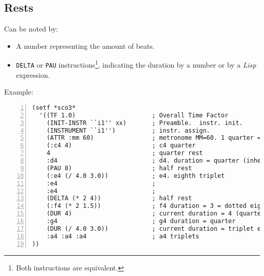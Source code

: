 \subsection{Rests}
Can be noted by:
\begin{itemize}
  \item A number representing the amount of beats.
    \item \texttt{DELTA} or \texttt{PAU} instructions\footnote{Both instructions are equivalent.}, indicating the duration by a number or by a \textit{Lisp} expression.
\end{itemize}
Example:
\begin{Verbatim}[frame=single,fontsize=\small,numbers=left,numbersep=2mm,
                 commandchars=+\[\]]
(setf *sco3*
  '((TF 1.0)                     ; Overall Time Factor
    (INIT-INSTR ``i1'' xx)       ; Preamble.  instr. init.
    (INSTRUMENT ``i1'')          ; instr. assign.
    (ATTR :mm 60)                ; metronome MM=60. 1 quarter = 1 sec.
    (:c4 4)                      ; c4 quarter
    4                            ; quarter rest
    :d4                          ; d4. duration = quarter (inherited)
    (PAU 8)                      ; half rest
    (:e4 (/ 4.0 3.0))            ; e4. eighth triplet
    :e4                          ;
    :e4                          ;
    (DELTA (* 2 4))              ; half rest
    (:f4 (* 2 1.5))              ; f4 duration = 3 = dotted eighth 
    (DUR 4)                      ; current duration = 4 (quarter)
    :g4                          ; g4 duration = quarter
    (DUR (/ 4.0 3.0))            ; current duration = triplet eighth
    :a4 :a4 :a4                  ; a4 triplets
))
\end{Verbatim}

